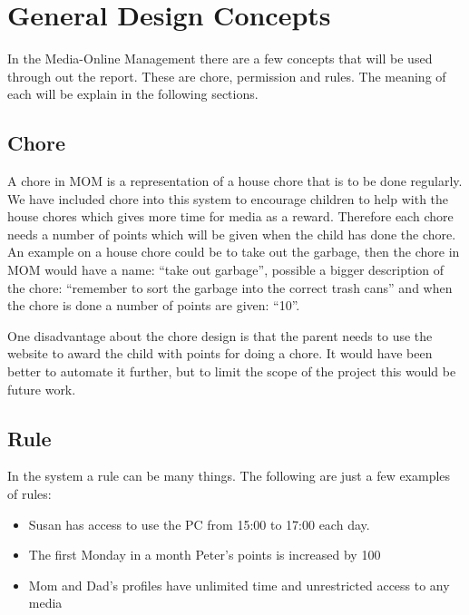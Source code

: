 \chapter{General Design Concepts}
\label{chapter:concepts}
In the Media-Online Management there are a few concepts that will be used through out the report. These are chore, permission and rules. The meaning of each will be explain in the following sections.

\section{Chore}
A chore in MOM is a representation of a house chore that is to be done regularly. We have included chore into this system to encourage children to help with the house chores which gives more time for media as a reward. Therefore each chore needs a number of points which will be given when the child has done the chore. 
An example on a house chore could be to take out the garbage, then the chore in MOM would have a name: ``take out garbage'', possible a bigger description of the chore: ``remember to sort the garbage into the correct trash cans'' and when the chore is done a number of points are given: ``10''.  

One disadvantage about the chore design is that the parent needs to use the website to award the child with points for doing a chore. It would have been better to automate it further, but to limit the scope of the project this would be future work.  
  



\section{Rule}
\label{sec:rule}
In the system a rule can be many things. The following are just a few examples of rules:

\begin{itemize}
	\item Susan has access to use the PC from 15:00 to 17:00 each day.
	\item The first Monday in a month Peter's points is increased by 100
	\item Mom and Dad's profiles have unlimited time and unrestricted access to any media
\end{itemize}

